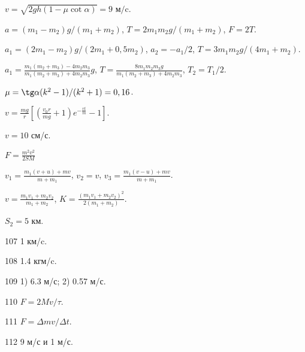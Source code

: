 \begin{Answer}{88}
$ v = \sqrt{2gh(1 - \mu \cot \alpha)} = 9 \textrm{ м/c}.$
\end{Answer}
\begin{Answer}{89}
$a = (m_1 - m_2)g / (m_1 + m_2)$, $T = 2 m_1 m_2 g /(m_1 + m_2)$, $F = 2T$.
\end{Answer}
\begin{Answer}{90}
$a_1 = (2m_1-m_2)g/(2m_1+0,5m_2)$, $a_2 = -a_1/2$, $T=3m_1 m_2g/(4m_1 + m_2)$.
\end{Answer}
\begin{Answer}{92}
$a_1 = \frac{m_1(m_2+m_3)-4m_2m_3}{m_1(m_2+m_3)+4m_2m_3}g$, $T= \frac{8m_1m_2m_3g}{m_1(m_2+m_3)+4m_2m_3}$, $T_2 = T_1/2$.
\end{Answer}
\begin{Answer}{93}
$\mu = \tg \alpha (k^2-1)/(k^2+1) = 0,16$.
\end{Answer}
\begin{Answer}{94}
$v = \frac{mg}{r}\left[ \left( \frac{v_0r}{mg} +1 \right)e^{-\frac{rt}{m}} - 1 \right]$.
\end{Answer}
\begin{Answer}{95}
$v=10$ см/с.
\end{Answer}
\begin{Answer}{96}
$F = \frac{m^2 v^2}{2SM}$
\end{Answer}
\begin{Answer}{97}
$v_1 = \frac{m_1(v+u)+mv}{m+m_1}$, $v_2 = v$, $v_3 = \frac{m_1(v-u)+mv}{m+m_1}$.
\end{Answer}
\begin{Answer}{98}
$v = \frac{m_1v_1 + m_2v_2}{m_1+m_2}$, $K = \frac{(m_1v_1+m_2v_2)^2}{2(m_1+m_2)}$.
\end{Answer}
\begin{Answer}{99}
$S_2 = 5$ км.
\end{Answer}
\begin{Answer}{107}
1 км/c.
\end{Answer}
\begin{Answer}{108}
1.4 кгм/c.
\end{Answer}
\begin{Answer}{109}
1) 6.3 м/с; 2) 0.57 м/с.
\end{Answer}
\begin{Answer}{110}
$F = 2Mv/\tau$.
\end{Answer}
\begin{Answer}{111}
$F = \Delta m v/ \Delta t$.
\end{Answer}
\begin{Answer}{112}
9 м/с и 1 м/с.
\end{Answer}
